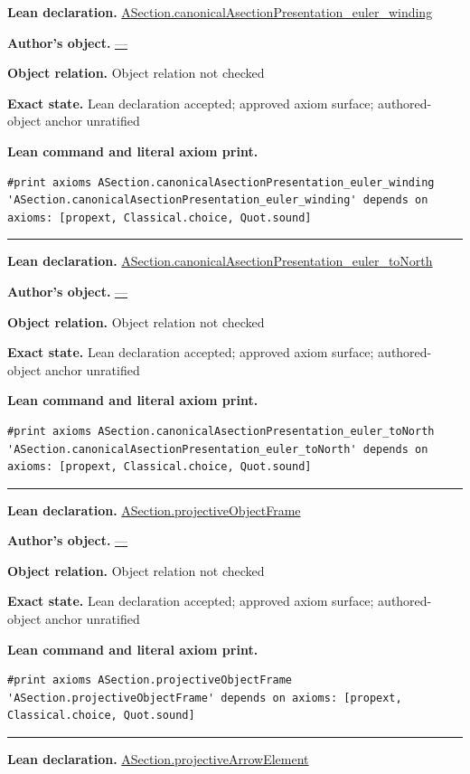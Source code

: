 \documentclass[11pt]{article}
\theoremstyle{plain}
\theoremstyle{definition}
\theoremstyle{remark}
\begin{document}
\begin{tcolorbox}
\textbf{Lean declaration.} \url{ASection.canonicalAsectionPresentation_euler_winding}
\par\textbf{Author's object.} \url{—}
\par\textbf{Object relation.} Object relation not checked
\par\textbf{Exact state.} Lean declaration accepted; approved axiom surface; authored-object anchor unratified
\par\smallskip\textbf{Lean command and literal axiom print.}
\begin{Verbatim}[breaklines=true,breakanywhere=true,fontsize=\small]
#print axioms ASection.canonicalAsectionPresentation_euler_winding
'ASection.canonicalAsectionPresentation_euler_winding' depends on axioms: [propext, Classical.choice, Quot.sound]
\end{Verbatim}
\medskip\hrule\medskip
\textbf{Lean declaration.} \url{ASection.canonicalAsectionPresentation_euler_toNorth}
\par\textbf{Author's object.} \url{—}
\par\textbf{Object relation.} Object relation not checked
\par\textbf{Exact state.} Lean declaration accepted; approved axiom surface; authored-object anchor unratified
\par\smallskip\textbf{Lean command and literal axiom print.}
\begin{Verbatim}[breaklines=true,breakanywhere=true,fontsize=\small]
#print axioms ASection.canonicalAsectionPresentation_euler_toNorth
'ASection.canonicalAsectionPresentation_euler_toNorth' depends on axioms: [propext, Classical.choice, Quot.sound]
\end{Verbatim}
\medskip\hrule\medskip
\textbf{Lean declaration.} \url{ASection.projectiveObjectFrame}
\par\textbf{Author's object.} \url{—}
\par\textbf{Object relation.} Object relation not checked
\par\textbf{Exact state.} Lean declaration accepted; approved axiom surface; authored-object anchor unratified
\par\smallskip\textbf{Lean command and literal axiom print.}
\begin{Verbatim}[breaklines=true,breakanywhere=true,fontsize=\small]
#print axioms ASection.projectiveObjectFrame
'ASection.projectiveObjectFrame' depends on axioms: [propext, Classical.choice, Quot.sound]
\end{Verbatim}
\medskip\hrule\medskip
\textbf{Lean declaration.} \url{ASection.projectiveArrowElement}

\end{tcolorbox}
\end{document}
